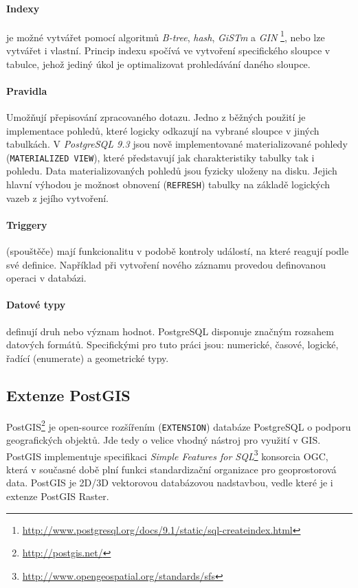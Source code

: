 \documentclass[a4paper,12pt,oneside]{report}
\begin{document}
\paragraph*{Indexy} je možné vytvářet pomocí algoritmů
\textit{B-tree}, \textit{hash}, \textit{GiSTm} a \textit{GIN}
\footnote{\url{http://www.postgresql.org/docs/9.1/static/sql-createindex.html}},
nebo lze vytvářet i vlastní. Princip indexu spočívá ve vytvoření
specifického sloupce v tabulce, jehož jediný úkol je optimalizovat
prohledávání daného sloupce.

\paragraph*{Pravidla} Umožňují přepisování zpracovaného dotazu. 
Jedno z běžných použití je implementace pohledů, které logicky odkazují na vybrané sloupce v
jiných tabulkách. V \textit{PostgreSQL 9.3 } jsou nově implementované
materializované pohledy (\texttt{MATERIALIZED VIEW}), které
představují jak charakteristiky tabulky tak i pohledu. Data
materializovaných pohledů jsou fyzicky uloženy na disku. Jejich hlavní
výhodou je možnost  obnovení (\texttt{REFRESH})  tabulky na základě logických vazeb z jejího vytvoření.

\paragraph*{Triggery} (spouštěče) mají funkcionalitu v podobě kontroly
událostí, na které reagují podle své definice. Například při vytvoření
nového záznamu provedou definovanou operaci v databázi.

\paragraph*{Datové typy} definují druh nebo význam hodnot.
PostgreSQL disponuje značným rozsahem datových formátů. Specifickými pro tuto
práci jsou: numerické, časové, logické, řadící (enumerate) a
geometrické typy.

\subsection{Extenze PostGIS}
PostGIS\footnote{\url{http://postgis.net/}} je open-source rozšířením
(\texttt{EXTENSION}) databáze PostgreSQL o podporu geografických
objektů. Jde tedy o velice vhodný nástroj pro využití v GIS. PostGIS
implementuje specifikaci \textit{Simple Features for
  SQL}\footnote{\url{http://www.opengeospatial.org/standards/sfs} }
konsorcia    \acs{OGC}, která v současné době plní funkci standardizační
organizace pro geoprostorová data. PostGIS je 2D/3D vektorovou
databázovou nadstavbou, vedle které je i extenze PostGIS Raster.
\end{document}
